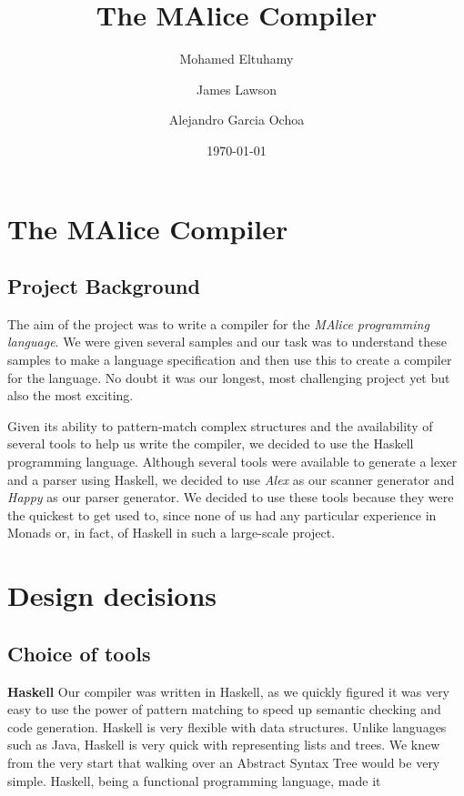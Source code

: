 \documentclass[a4wide, 10pt]{article}
\begin{document}
\title{The MAlice Compiler}

\author{Mohamed Eltuhamy \and James Lawson \and Alejandro Garcia Ochoa}

\date{\today}         %

\maketitle            %


\section{The MAlice Compiler}

\subsection{Project Background}

The aim of the project was to write a compiler for the \textit{MAlice
programming language}. We were given several samples and our task was to
understand these samples to make a language specification and then use this to
create a compiler for the language. No doubt it was our longest, most
challenging project yet but also the most exciting.

Given its ability to pattern-match complex structures and the availability of
several tools to help us write the compiler, we decided to use the Haskell
programming language. Although several tools were available to generate a
lexer and a parser using Haskell, we decided to use \textit{Alex} as our
scanner generator and \textit{Happy} as our parser generator. We decided to
use these tools because they were the quickest to get used to, since none of
us had any particular experience in Monads or, in fact, of Haskell in such a
large-scale project.


\section{Design decisions}

\subsection{Choice of tools} \textbf{Haskell} Our compiler was
written in Haskell, as we quickly figured it was very easy to use the power of
pattern matching to speed up semantic checking and code generation.
Haskell is very flexible with data structures. Unlike languages such as Java, 
Haskell is very quick with representing lists and trees. We knew from the
very start that walking over an Abstract Syntax Tree would be very simple.
Haskell, being a functional programming language, made it 
\end{document}
